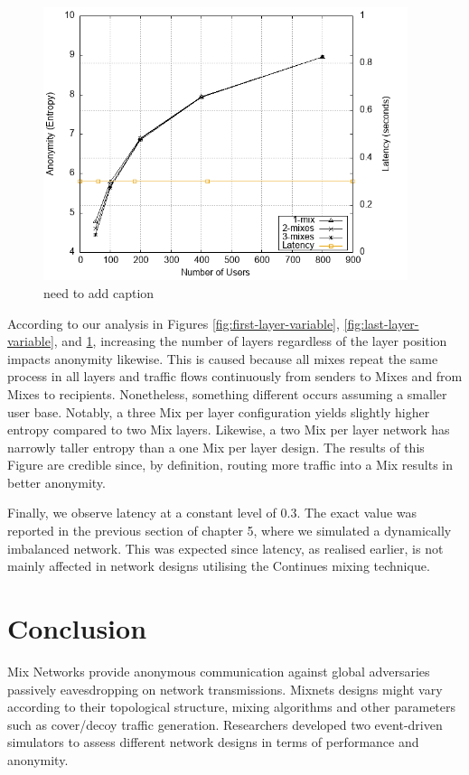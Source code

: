 \documentclass[logo,msc,cyber]{infthesis}   %
\begin{document}
\begin{figure}[h!]
    \centering
    \includegraphics[height=8cm]{figures/simulator_extentions/middle_layer_variable.png}
    \caption{need to add caption}
    \label{fig:middle-layer-variable}
\end{figure} 

According to our analysis in Figures \ref{fig:first-layer-variable},
\ref{fig:last-layer-variable}, and \ref{fig:middle-layer-variable},  increasing
the number of layers regardless of the layer position impacts anonymity
likewise. This is caused because all mixes repeat the same process in all layers
and traffic flows continuously from senders to Mixes and from Mixes to
recipients. Nonetheless, something different occurs assuming a smaller user
base. Notably, a three Mix per layer configuration yields slightly higher entropy
compared to two Mix layers. Likewise, a two Mix per layer network has narrowly
taller entropy than a one Mix per layer design. The results of this Figure are
credible since, by definition, routing more traffic into a Mix results in better
anonymity.

Finally, we observe latency at a constant level of 0.3. The exact value was
reported in the previous section of chapter 5, where we simulated a dynamically
imbalanced network. This was expected since latency, as realised earlier, is not
mainly affected in network designs utilising the Continues mixing technique. 

\chapter{Conclusion}

Mix Networks provide anonymous communication against global adversaries
passively eavesdropping on network transmissions. Mixnets designs might vary
according to their topological structure, mixing algorithms and other parameters
such as cover/decoy traffic generation. Researchers developed two event-driven
simulators to assess different network designs in terms of performance and
anonymity.
\end{document}
